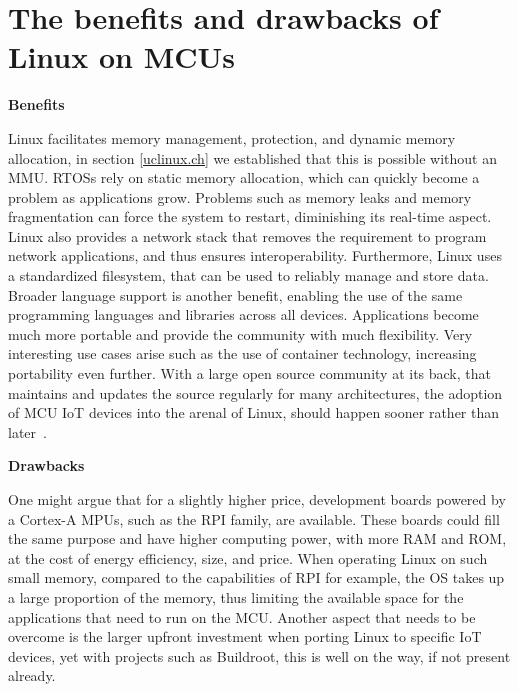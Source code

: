 \section{The benefits and drawbacks of Linux on MCUs}
\textbf{Benefits}

Linux facilitates memory management, protection, and dynamic memory allocation, in section \ref{uclinux.ch} we established that this is possible without an MMU. RTOSs rely on static memory allocation, which can quickly become a problem as applications grow. Problems such as memory leaks and memory fragmentation can force the system to restart, diminishing its real-time aspect. Linux also provides a network stack that removes the requirement to program network applications, and thus ensures interoperability. Furthermore, Linux uses a standardized filesystem, that can be used to reliably manage and store data. Broader language support is another benefit, enabling the use of the same programming languages and libraries across all devices. Applications become much more portable and provide the community with much flexibility. Very interesting use cases arise such as the use of container technology, increasing portability even further. With a large open source community at its back, that maintains and updates the source regularly for many architectures, the adoption of MCU IoT devices into the arenal of Linux, should happen sooner rather than later~\cite{jaycarlson}.

\textbf{Drawbacks}

One might argue that for a slightly higher price, development boards powered by a Cortex-A MPUs, such as the RPI family, are available. These boards could fill the same purpose and have higher computing power, with more RAM and ROM, at the cost of energy efficiency, size, and price. When operating Linux on such small memory, compared to the capabilities of RPI for example, the OS takes up a large proportion of the memory, thus limiting the available space for the applications that need to run on the MCU. Another aspect that needs to be overcome is the larger upfront investment when porting Linux to specific IoT devices, yet with projects such as Buildroot, this is well on the way, if not present already.



